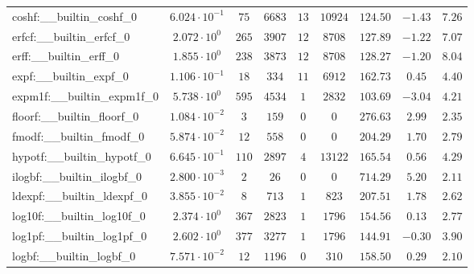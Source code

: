 \begin{tabular}{|l|c|c|c|c|c|c|c|c|}
coshf:\_\_builtin\_coshf\_0               & $ 6.024 \cdot 10^{-1} $ & $ 75     $ & $ 6683   $ & $ 13  $ & $ 10924  $ & $ 124.50      $ & $ -1.43   $ & $ 7.26    $ \\
erfcf:\_\_builtin\_erfcf\_0               & $ 2.072 \cdot 10^{0}  $ & $ 265    $ & $ 3907   $ & $ 12  $ & $ 8708   $ & $ 127.89      $ & $ -1.22   $ & $ 7.07    $ \\
erff:\_\_builtin\_erff\_0                 & $ 1.855 \cdot 10^{0}  $ & $ 238    $ & $ 3873   $ & $ 12  $ & $ 8708   $ & $ 128.27      $ & $ -1.20   $ & $ 8.04    $ \\
expf:\_\_builtin\_expf\_0                 & $ 1.106 \cdot 10^{-1} $ & $ 18     $ & $ 334    $ & $ 11  $ & $ 6912   $ & $ 162.73      $ & $ 0.45    $ & $ 4.40    $ \\
expm1f:\_\_builtin\_expm1f\_0             & $ 5.738 \cdot 10^{0}  $ & $ 595    $ & $ 4534   $ & $ 1   $ & $ 2832   $ & $ 103.69      $ & $ -3.04   $ & $ 4.21    $ \\
floorf:\_\_builtin\_floorf\_0             & $ 1.084 \cdot 10^{-2} $ & $ 3      $ & $ 159    $ & $ 0   $ & $ 0      $ & $ 276.63      $ & $ 2.99    $ & $ 2.35    $ \\
fmodf:\_\_builtin\_fmodf\_0               & $ 5.874 \cdot 10^{-2} $ & $ 12     $ & $ 558    $ & $ 0   $ & $ 0      $ & $ 204.29      $ & $ 1.70    $ & $ 2.79    $ \\
hypotf:\_\_builtin\_hypotf\_0             & $ 6.645 \cdot 10^{-1} $ & $ 110    $ & $ 2897   $ & $ 4   $ & $ 13122  $ & $ 165.54      $ & $ 0.56    $ & $ 4.29    $ \\
ilogbf:\_\_builtin\_ilogbf\_0             & $ 2.800 \cdot 10^{-3} $ & $ 2      $ & $ 26     $ & $ 0   $ & $ 0      $ & $ 714.29      $ & $ 5.20    $ & $ 2.11    $ \\
ldexpf:\_\_builtin\_ldexpf\_0             & $ 3.855 \cdot 10^{-2} $ & $ 8      $ & $ 713    $ & $ 1   $ & $ 823    $ & $ 207.51      $ & $ 1.78    $ & $ 2.62    $ \\
log10f:\_\_builtin\_log10f\_0             & $ 2.374 \cdot 10^{0}  $ & $ 367    $ & $ 2823   $ & $ 1   $ & $ 1796   $ & $ 154.56      $ & $ 0.13    $ & $ 2.77    $ \\
log1pf:\_\_builtin\_log1pf\_0             & $ 2.602 \cdot 10^{0}  $ & $ 377    $ & $ 3277   $ & $ 1   $ & $ 1796   $ & $ 144.91      $ & $ -0.30   $ & $ 3.90    $ \\
logbf:\_\_builtin\_logbf\_0               & $ 7.571 \cdot 10^{-2} $ & $ 12     $ & $ 1196   $ & $ 0   $ & $ 310    $ & $ 158.50      $ & $ 0.29    $ & $ 2.10    $ \\

\end{tabular}
